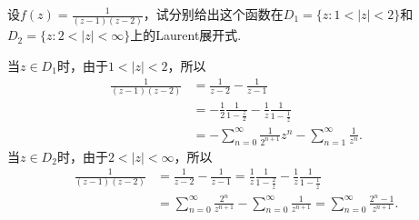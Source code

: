 \begin{example}\label{exam5.1.3}
设$f(z)=\frac1{(z-1)(z-2)}$，试分别给出这个函数在$D_1=\{z:1<|z|<2\}$和$D_2=\{z:2<|z|<\infty\}$上的Laurent展开式.
\end{example}
\begin{solution}
当$z\in D_1$时，由于$1<|z|<2$，所以
\begin{align*}
\frac1{(z-1)(z-2)}&=\frac1{z-2}-\frac1{z-1}\\
&=-\frac12\frac1{1-\frac z2}-\frac1z\frac1{1-\frac1z}\\
&=-\sum_{n=0}^\infty\frac1{2^{n+1}}z^n-\sum_{n=1}^\infty\frac1{z^n}.
\end{align*}
当$z\in D_2$时，由于$2<|z|<\infty$，所以
\begin{align*}
\frac1{(z-1)(z-2)}&=\frac1{z-2}-\frac1{z-1}
=\frac1z\frac1{1-\frac2z}-\frac1z\frac1{1-\frac1z}\\
&=\sum_{n=0}^\infty\frac{2^n}{z^{n+1}}-\sum_{n=0}^\infty\frac1{z^{n+1}}
=\sum_{n=0}^\infty\frac{2^n-1}{z^{n+1}}.
\end{align*}
\end{solution}

